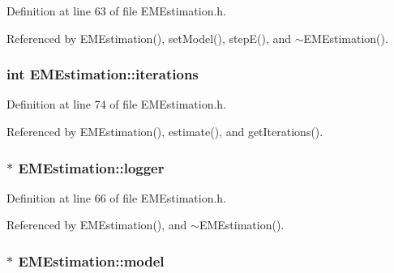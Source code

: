 Definition at line 63 of file E\+M\+Estimation.\+h.



Referenced by E\+M\+Estimation(), set\+Model(), step\+E(), and $\sim$\+E\+M\+Estimation().

\hypertarget{classEMEstimation_ad6086e6784a5c651e6d5ad45a0c84d11}{}
\subsubsection[{iterations}]{\setlength{\rightskip}{0pt plus 5cm}int E\+M\+Estimation\+::iterations\hspace{0.3cm}{\ttfamily [private]}}\label{classEMEstimation_ad6086e6784a5c651e6d5ad45a0c84d11}


Definition at line 74 of file E\+M\+Estimation.\+h.



Referenced by E\+M\+Estimation(), estimate(), and get\+Iterations().

\hypertarget{classEMEstimation_a77ab33231a9baa8c5a2ceb48534137a0}{}
\subsubsection[{logger}]{$\ast$ E\+M\+Estimation\+::logger\hspace{0.3cm}{\ttfamily [private]}}\label{classEMEstimation_a77ab33231a9baa8c5a2ceb48534137a0}


Definition at line 66 of file E\+M\+Estimation.\+h.



Referenced by E\+M\+Estimation(), and $\sim$\+E\+M\+Estimation().

\hypertarget{classEMEstimation_ad7a5d7459c7c0632a1aa3917fd7f3ba0}{}
\subsubsection[{model}]{$\ast$ E\+M\+Estimation\+::model\hspace{0.3cm}{\ttfamily [private]}}\label{classEMEstimation_ad7a5d7459c7c0632a1aa3917fd7f3ba0}


